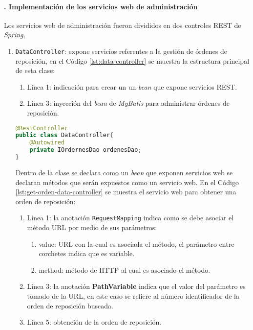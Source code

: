 \paragraph{. Implementación de los servicios web de administración\\}
Los servicios web de administración fueron divididos en dos controles REST de \textit{Spring}, 
\begin{enumerate}
	\item \texttt{DataController}: expone servicios referentes a la gestión de órdenes de reposición, en el Código \ref{lst:data-controller} se muestra la estructura principal de esta clase:
	\begin{enumerate}
		\item Línea 1: indicación para crear un un \textit{bean} que expone servicios REST.
		\item Línea 3: inyección del \textit{bean} de \textit{MyBatis} para administrar órdenes de reposición.
	\end{enumerate}

\begin{lstlisting}[language=Java, caption={Controlador para exponer servicios web de órdenes de reposición.}, captionpos=b, label={lst:data-controller}]
@RestController
public class DataController{
	@Autowired
	private IOrdernesDao ordenesDao;
}
\end{lstlisting}

	Dentro de la clase se declara como un \textit{bean} que exponen servicios web se declaran métodos que serán expuestos como un servicio web. En el Código \ref{lst:get-orden-data-controller} se muestra el servicio web para obtener una orden de reposición:
	\begin{enumerate}
		\item Línea 1: la anotación \texttt{RequestMapping} indica como se debe asociar el método URL por medio de sus parámetros:
		\begin{enumerate}
			\item value: URL con la cual es asociada el método, el parámetro entre corchetes indica que es variable.
			\item method: método de HTTP al cual es asociado el método. 
		\end{enumerate}
		\item Línea 3: la anotación \textbf{PathVariable} indica que el valor del parámetro es tomado de la URL, en este caso se refiere al número identificador de la orden de reposición buscada.
		\item Línea 5: obtención de la orden de reposición.
	\end{enumerate}


\end{enumerate}
